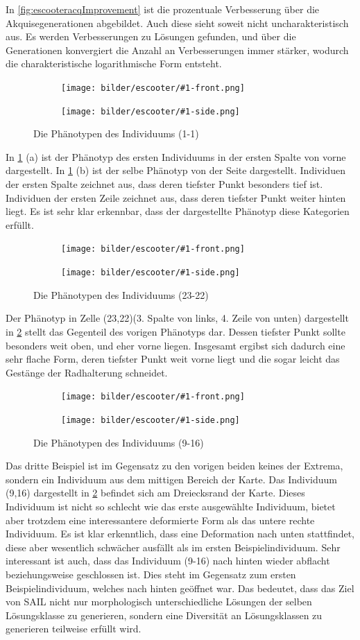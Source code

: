 In \cref{fig:escooteracqImprovement} ist die prozentuale Verbesserung über die Akquisegenerationen abgebildet.
Auch diese sieht soweit nicht uncharakteristisch aus.
Es werden Verbesserungen zu Lösungen gefunden, und über die Generationen konvergiert die Anzahl an Verbesserungen immer stärker, wodurch die charakteristische logarithmische Form entsteht.

\newcommand{\escooterpheno}[1]{
\begin{figure}[h]
	\centering
	\begin{subfigure}[t]{0.5\textwidth}
		\centering
		\texttt{[image: bilder/escooter/\#1-front.png]}
		\subcaption{vorne}
	\end{subfigure}\hfill
	\begin{subfigure}[t]{0.5\textwidth}
		\centering
		\texttt{[image: bilder/escooter/\#1-side.png]}
		\subcaption{Seite}
	\end{subfigure}
\caption{Die Phänotypen des Individuums (#1)}
\label{fig:escooterpheno#1}
\end{figure}
}

\newcommand{\escref}[1]{
	\cref{fig:escooterpheno#1}
}

\escooterpheno{1-1}

In \escref{1-1} (a) ist der Phänotyp des ersten Individuums in der ersten Spalte von vorne dargestellt.
In \escref{1-1} (b) ist der selbe Phänotyp von der Seite dargestellt.
Individuen der ersten Spalte zeichnet aus, dass deren tiefster Punkt besonders tief ist.
Individuen der ersten Zeile zeichnet aus, dass deren tiefster Punkt weiter hinten liegt.
Es ist sehr klar erkennbar, dass der dargestellte Phänotyp diese Kategorien erfüllt.


\escooterpheno{23-22}

Der Phänotyp in Zelle (23,22)(3. Spalte von links, 4. Zeile von unten) dargestellt in \escref{23-22} stellt das Gegenteil des vorigen Phänotyps dar.
Dessen tiefster Punkt sollte besonders weit oben, und eher vorne liegen.
Insgesamt ergibst sich dadurch eine sehr flache Form, deren tiefster Punkt weit vorne liegt und die sogar leicht das Gestänge der Radhalterung schneidet.

\escooterpheno{9-16}

Das dritte Beispiel ist im Gegensatz zu den vorigen beiden keines der Extrema, sondern ein Individuum aus dem mittigen Bereich der Karte.
Das Individuum (9,16) dargestellt in \escref{23-22} befindet sich am Dreiecksrand der Karte.
Dieses Individuum ist nicht so schlecht wie das erste ausgewählte Individuum, bietet aber trotzdem eine interessantere deformierte Form als das untere rechte Individuum.
Es ist klar erkenntlich, dass eine Deformation nach unten stattfindet, diese aber wesentlich schwächer ausfällt als im ersten Beispielindividuum.
Sehr interessant ist auch, dass das Individuum (9-16) nach hinten wieder abflacht beziehungsweise geschlossen ist.
Dies steht im Gegensatz zum ersten Beispielindividuum, welches nach hinten geöffnet war.
Das bedeutet, dass das Ziel von SAIL nicht nur morphologisch unterschiedliche Lösungen der selben Lösungsklasse zu generieren, sondern eine Diversität an Lösungsklassen zu generieren teilweise erfüllt wird.

